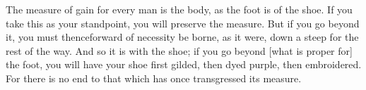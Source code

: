 The measure of gain for  every man is the body, as the foot  is of the shoe. If
you take this as your standpoint, you  will preserve the measure. But if you go
beyond it,  you must thenceforward  of necessity be borne,  as it were,  down a
steep for the  rest of the way.  And so it is  with the shoe; if  you go beyond
[what is proper for] the foot, you  will have your shoe first gilded, then dyed
purple,  then  embroidered.  For  there  is  no end  to  that  which  has  once
transgressed its measure.
